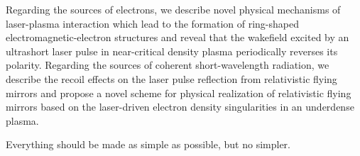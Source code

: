 \documentclass[10pt, a4paper, twoside, openright]{report}
\begin{document}
Regarding the sources of electrons, we describe novel physical mechanisms of laser-plasma interaction which lead to the formation of ring-shaped electromagnetic-electron structures and reveal that the wakefield excited by an ultrashort laser pulse in near-critical density plasma periodically reverses its polarity. Regarding the sources of coherent short-wavelength radiation, we describe the recoil effects on the laser pulse reflection from relativistic flying mirrors and propose a novel scheme for physical realization of relativistic flying mirrors based on the laser-driven electron density singularities in an underdense plasma. \\




\clearpage
\pagestyle{myfancy}
\tableofcontents



\begin{savequote}[0.45\linewidth]
	\begin{fquote}
		 Everything should be made as simple as possible, but no simpler.
	\end{fquote}
\end{savequote}
\end{document}
